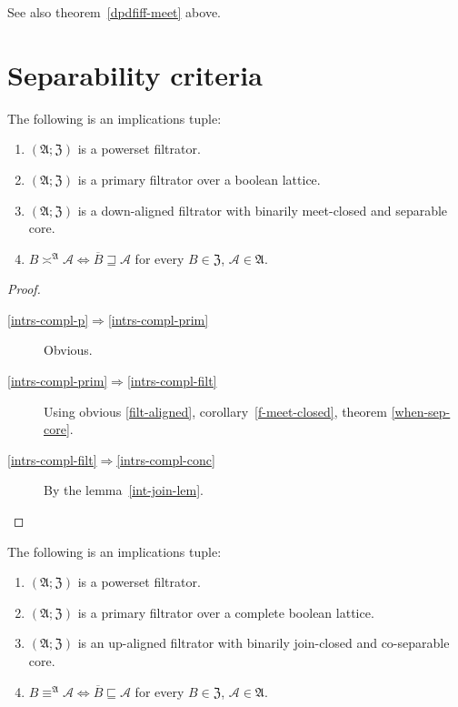 See also theorem~\ref{dpdfiff-meet} above.

\section{Separability criteria}
\begin{thm}
\label{f-intrs-and-compl}The following is an implications tuple:
\begin{enumerate}
\item \label{intrs-compl-p}$(\mathfrak{A};\mathfrak{Z})$ is a powerset
filtrator.
\item \label{intrs-compl-prim}$(\mathfrak{A};\mathfrak{Z})$ is a primary
filtrator over a boolean lattice.
\item \label{intrs-compl-filt}$(\mathfrak{A};\mathfrak{Z})$ is a down-aligned filtrator
with binarily meet-closed and separable core.
\item \label{intrs-compl-conc}$B\asymp^{\mathfrak{A}}\mathcal{A}\Leftrightarrow\overline{B}\sqsupseteq\mathcal{A}$
for every $B\in\mathfrak{Z}$, $\mathcal{A}\in\mathfrak{A}$.
\end{enumerate}
\end{thm}
\begin{proof}
~
\begin{description}
\item [{\ref{intrs-compl-p}$\Rightarrow$\ref{intrs-compl-prim}}] Obvious.
\item [{\ref{intrs-compl-prim}$\Rightarrow$\ref{intrs-compl-filt}}] Using
obvious \ref{filt-aligned}, corollary~\ref{f-meet-closed}, theorem
\ref{when-sep-core}.
\item [{\ref{intrs-compl-filt}$\Rightarrow$\ref{intrs-compl-conc}}] By
the lemma~\ref{int-join-lem}.
\end{description}
\end{proof}
\begin{thm}
The following is an implications tuple:
\begin{enumerate}
\item \label{join-compl-p}$(\mathfrak{A};\mathfrak{Z})$ is a powerset
filtrator.
\item \label{join-compl-prim}$(\mathfrak{A};\mathfrak{Z})$ is a primary
filtrator over a complete boolean lattice.
\item \label{join-compl-filt}$(\mathfrak{A};\mathfrak{Z})$ is an up-aligned filtrator
with binarily join-closed and co-separable core.
\item \label{join-compl-conc}$B\equiv^{\mathfrak{A}}\mathcal{A}\Leftrightarrow\overline{B}\sqsubseteq\mathcal{A}$
for every $B\in\mathfrak{Z}$, $\mathcal{A}\in\mathfrak{A}$.
\end{enumerate}
\end{thm}
